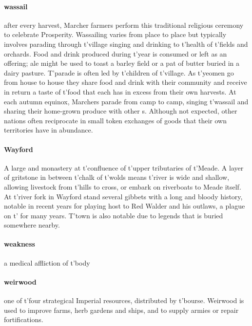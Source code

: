 \paragraph{wassail} after every harvest, Marcher farmers perform this traditional religious ceremony to celebrate Prosperity. Wassailing varies from place to place but typically involves parading through t'\allowbreak village singing and drinking to t'\allowbreak health of t'\allowbreak fields and orchards. Food and drink produced during t'\allowbreak year is consumed or left as an offering; ale might be used to toast a barley field or a pat of butter buried in a dairy pasture. T'parade is often led by t'\allowbreak children of t'\allowbreak village. As t'\allowbreak yeomen go from house to house they share food and drink with their community and receive in return a taste of t'\allowbreak food that each  has in excess from their own harvests. At each autumn equinox, Marchers parade from camp to camp, singing t'\allowbreak wassail and sharing their home-grown produce with other s. Although not expected, other nations often reciprocate in small token exchanges of goods that their own territories have in abundance.
\paragraph{Wayford} A large  and monastery at t'\allowbreak confluence of t'\allowbreak upper tributaries of t'\allowbreak Meade. A layer of gritstone in between t'\allowbreak chalk of t'\allowbreak wolds means t'\allowbreak river is wide and shallow, allowing livestock from t'\allowbreak hills to cross, or embark on riverboats to Meade itself. At t'\allowbreak river fork in Wayford stand several gibbets with a long and bloody history, notable in recent years for playing host to Red Walder and his outlaws, a plague on t'\allowbreak {} for many years. T'town is also notable due to legends that  is buried somewhere nearby.
\paragraph{weakness} a medical affliction of t'\allowbreak body
\paragraph{weirwood} one of t'\allowbreak four strategical Imperial resources, distributed by t'\allowbreak bourse. Weirwood is used to improve farms, herb gardens and ships, and to supply armies or repair fortifications.
